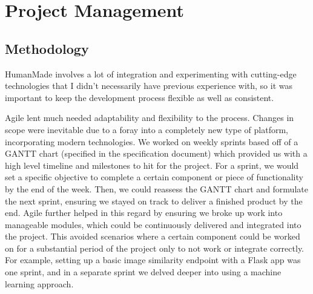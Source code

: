 \documentclass[12pt,a4paper]{article}
\begin{document}
\section{Project Management}
\subsection{Methodology}
HumanMade involves a lot of integration and experimenting with cutting-edge technologies that I didn't necessarily have previous experience with, so it was important to keep the development process flexible as well as consistent.

Agile lent much needed adaptability and flexibility to the process. Changes in scope were inevitable due to a foray into a completely new type of platform, incorporating modern technologies. We worked on weekly sprints based off of a GANTT chart (specified in the specification document) which provided us with a high level timeline and milestones to hit for the project. For a sprint, we would set a specific objective to complete a certain component or piece of functionality by the end of the week. Then, we could reassess the GANTT chart and formulate the next sprint, ensuring we stayed on track to deliver a finished product by the end. Agile further helped in this regard by ensuring we broke up work into manageable modules, which could be continuously delivered and integrated into the project. This avoided scenarios where a certain component could be worked on for a substantial period of the project only to not work or integrate correctly. For example, setting up a basic image similarity endpoint with a Flask app was one sprint, and in a separate sprint we delved deeper into using a machine learning approach.
\end{document}
